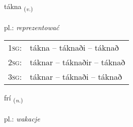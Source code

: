 \documentclass[frontgrid, backgrid]{flacards}\usepackage[]{graphicx}\usepackage[]{xcolor}
\begin{document}
\renewcommand{\blhead}{\vskip5pt {\small\bfseries\footnotesize Sagnorð | Verb }}
\renewcommand{\bcfoot}{\vskip5pt \hspace{2pt}{\small\bfseries\footnotesize 2K}}


{tákna \small{\textsubscript{(\textit{v.})}} \\[1ex] %
\textphonetic{[tʰauhkna]} \\
pl.: \emph{reprezentować} \\  [2ex]
\renewcommand*{\arraystretch}{0.8}
\begin{tabular}{p{1cm}l}
\textsc{1sg}: & tákna -- táknaði -- táknað \\ 
\textsc{2sg}: & táknar -- táknaðir -- táknað \\ 
\textsc{3sg}: & táknar -- táknaði -- táknað \\ 
\end{tabular}
}

\renewcommand{\flhead}{\vskip5pt \fboxsep=0pt {\small\bfseries\footnotesize Nafnorð | Noun}}
\renewcommand{\fcfoot}{\vskip5pt \fboxsep=0pt \hspace{2pt}{\small\bfseries\footnotesize 2K}}

\renewcommand{\blhead}{\vskip5pt {\small\bfseries\footnotesize Nafnorð | Noun }}
\renewcommand{\bcfoot}{\vskip5pt \hspace{2pt}{\small\bfseries\footnotesize 2K}}


{frí \small{\textsubscript{(\textit{n.})}} \\[1ex] %
\textphonetic{[friː]} \\
pl.: \emph{wakacje} \\  [2ex]
\renewcommand*{\arraystretch}{0.8}
}

\renewcommand{\flhead}{\vskip5pt \fboxsep=0pt {\small\bfseries\footnotesize Sagnorð | Verb}}
\renewcommand{\fcfoot}{\vskip5pt \fboxsep=0pt \hspace{2pt}{\small\bfseries\footnotesize 2K}}
\end{document}
